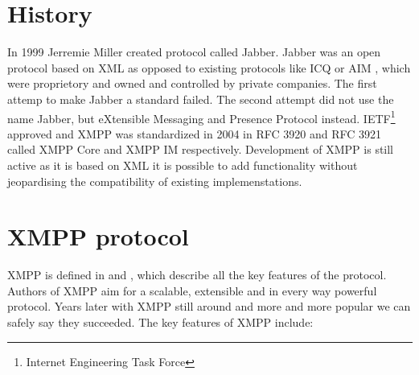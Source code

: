 \section{History}
In 1999 Jerremie Miller created protocol called Jabber. Jabber was an open protocol based on XML as opposed to existing protocols like ICQ \cite{ICQ} or AIM \cite{AIM}, which were proprietory and owned and controlled by private companies. The first attemp to make Jabber a standard failed. The second attempt did not use the name Jabber, but eXtensible Messaging and Presence Protocol instead. IETF\footnote{Internet Engineering Task Force} approved and XMPP was standardized in 2004 in RFC 3920 and RFC 3921 called XMPP Core and XMPP IM respectively. Development of XMPP is still active as it is based on XML it is possible to add functionality without jeopardising the compatibility of existing implemenstations.      

\section{XMPP protocol}
XMPP is defined in \cite{xmppCoreRFC} and \cite{xmppIMRFC}, which describe all the key features of the protocol. Authors of XMPP aim for a scalable, extensible and in every way powerful protocol. Years later with XMPP still around and more and more popular we can safely say they succeeded. The key features of XMPP include:

